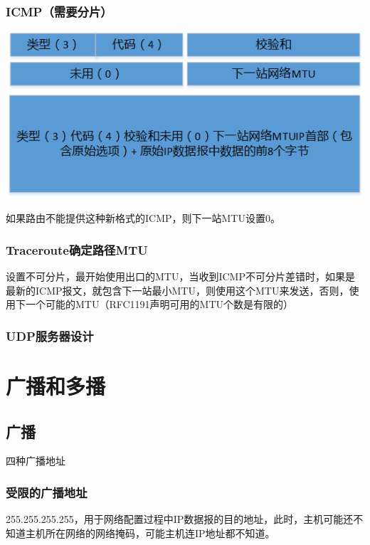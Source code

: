 \subsubsection{ICMP（需要分片）}

\includegraphics[scale=1]{protocol/resources/ICMP分片.png}

如果路由不能提供这种新格式的ICMP，则下一站MTU设置0。

\subsubsection{Traceroute确定路径MTU}

设置不可分片，最开始使用出口的MTU，当收到ICMP不可分片差错时，如果是最新的ICMP报文，就包含下一站最小MTU，则使用这个MTU来发送，否则，使用下一个可能的MTU（RFC1191声明可用的MTU个数是有限的）

\subsubsection{UDP服务器设计}



\section{广播和多播}

\subsection{广播}

四种广播地址

\subsubsection{受限的广播地址}

255.255.255.255，用于网络配置过程中IP数据报的目的地址，此时，主机可能还不知道主机所在网络的网络掩码，可能主机连IP地址都不知道。

